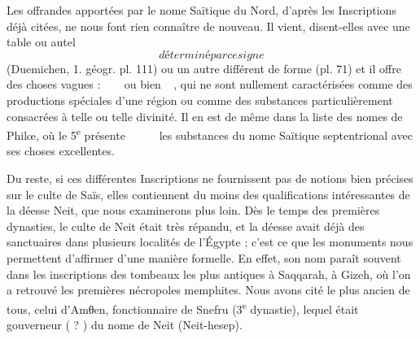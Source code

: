 \documentclass[a4paper, 11pt, oneside]{article}
\newcommand*\hieroglyhicsAAAX{}
\newcommand*\hieroglyhicsAABY{\raisebox{0.5ex}{}}
\newcommand*\hieroglyhicsAADT{}
\newcommand*\hieroglyhicsAADV{\raisebox{0.5ex}{}}
\newcommand*\hieroglyhicsAAEZ{}
\newcommand*\hieroglyhicsAAFB{}
\newcommand*\hieroglyhicsAAIK{}
\newcommand*\hieroglyhicsAAMP{}
\newcommand*\hieroglyhicsAAQW{}
\newcommand*\hieroglyhicsAAQX{}
\newcommand*\hieroglyhicsAAQY{}
\newcommand*\hieroglyhicsAAQZ{}
\newcommand*\hieroglyhicsAARA{}
\newcommand*\hieroglyhicsAARB{}
\newcommand*\hieroglyhicsAARC{\raisebox{0.5ex}{}}
\newcommand*\hieroglyhicsAARD{}
\newcommand*\hieroglyhicsAARE{}
\newcommand*\hieroglyhicsAARF{}
\newcommand*\hieroglyhicsAARG{}
\newcommand*\hieroglyhicsAARH{}
\newcommand*\hieroglyhicsAARI{}
\newcommand*\hieroglyhicsAARJ{}
\newcommand*\hieroglyhicsAARK{\raisebox{0.5ex}{}}
\newcommand*\hieroglyhicsAARL{}
\begin{document}
Les offrandes apportées par le nome Saïtique du Nord, d'après les Inscriptions déjà citées, ne nous font rien connaître de nouveau. Il vient, disent-elles avec une table ou autel $\hieroglyhicsAAQW$ déterminé par ce signe $\hieroglyhicsAAQX$ (Duemichen, 1. géogr. pl. 111) ou un autre différent de forme (pl. 71) et il offre des choses vagues : $\hieroglyhicsAAQY\:\hieroglyhicsAAQZ\:\hieroglyhicsAAMP\allowbreak\:\hieroglyhicsAADV\:\hieroglyhicsAAAX\allowbreak\:\hieroglyhicsAAIK\:\hieroglyhicsAARA$ ou bien $\hieroglyhicsAARB\:\hieroglyhicsAARC\allowbreak\:\hieroglyhicsAARD\:\hieroglyhicsAARE$, qui ne sont nullement caractérisées comme des productions spéciales d'une région ou comme des substances particulièrement consacrées à telle ou telle divinité. Il en est de même dans la liste des nomes de Philœ, où le 5\textsuperscript{e} présente $\hieroglyhicsAAEZ\:\hieroglyhicsAARF\:\hieroglyhicsAADT\allowbreak\:\hieroglyhicsAARG\:\hieroglyhicsAARH\:\hieroglyhicsAARI\allowbreak\:\hieroglyhicsAARJ\:\hieroglyhicsAABY\:\hieroglyhicsAARK\allowbreak\:\hieroglyhicsAAFB\:\hieroglyhicsAARL$ les substances du nome Saïtique septentrional avec ses choses excellentes.

Du reste, si ces différentes Inscriptions ne fournissent pas de notions bien précises sur le culte de Saïs, elles contiennent du moins des qualifications intéressantes de la déesse Neit, que nous examinerons plus loin.
 Dès le temps des premières dynasties, le culte de Neit était très répandu, et la déesse avait déjà des sanctuaires dans plusieurs localités de l'Égypte ; c'est ce que les monuments nous permettent d'affirmer d'une manière formelle. En effet, son nom paraît souvent dans les inscriptions des tombeaux les plus antiques à Saqqarah, à Gizeh, où l'on a retrouvé les premières nécropoles memphites. Nous avons cité le plus ancien de tous, celui d'Amθen, fonctionnaire de Snefru (3\textsuperscript{e} dynastie), lequel était gouverneur ( ? ) du nome de Neit (Neit-hesep).
\end{document}
